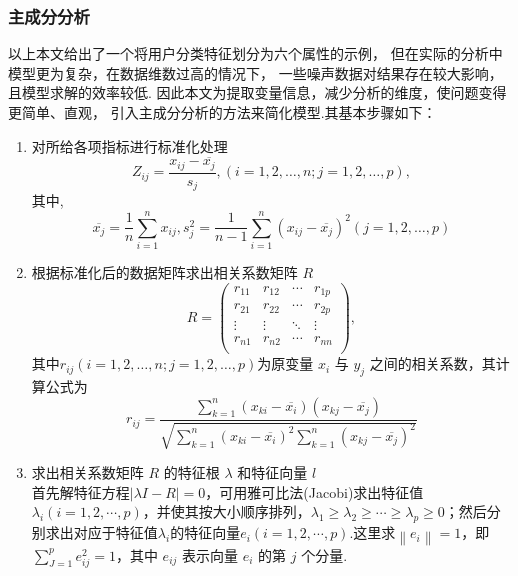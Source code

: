 \subsubsection{主成分分析}

以上本文给出了一个将用户分类特征划分为六个属性的示例，
但在实际的分析中模型更为复杂，在数据维数过高的情况下，
一些噪声数据对结果存在较大影响，且模型求解的效率较低.
因此本文为提取变量信息，减少分析的维度，使问题变得更简单、直观，
引入主成分分析的方法来简化模型.其基本步骤如下：

\begin{enumerate}[(1)]
    \item 对所给各项指标进行标准化处理
    \begin{equation}
        Z_{ij}=\frac{x_{ij}-\overline{x_j}}{s_j},(i=1,2,…,n;j=1,2,…,p),
    \end{equation}
    其中,
    \begin{equation}
        \overline{x_j}=\frac{1}{n}\sum\limits_{i=1}^{n}x_{ij},s_j^2=\frac{1}{n-1}
        \sum\limits_{i=1}^{n}(x_{ij}-\overline{x_j})^2(j=1,2,…,p)
    \end{equation}
    \item 根据标准化后的数据矩阵求出相关系数矩阵 $R$
    \begin{equation}
        R=\begin{pmatrix}
        r_{11} & r_{12} & \cdots & r_{1p}\\
        r_{21} & r_{22} & \cdots & r_{2p}\\
        \vdots & \vdots & \ddots & \vdots\\
        r_{n1} & r_{n2} & \cdots & r_{nn}\\
        \end{pmatrix},
    \end{equation}
    其中$r_{ij}(i=1,2,…,n;j=1,2,…,p)$为原变量 $x_i$ 与 $y_j$ 之间的相关系数，其计算公式为
    \begin{equation}
        r_{ij}=\frac{\sum\limits_{k=1}^{n}(x_{ki}-\overline{x_i})(x_{kj}-\overline{x_j})}{\sqrt{\sum\limits_{k=1}^{n}(x_{ki}-\overline{x_i})^2\sum\limits_{k=1}^{n}(x_{kj}-\overline{x_j})^2}}
    \end{equation}
    \item 求出相关系数矩阵 $R$ 的特征根 $\lambda$ 和特征向量 $l$
    \\首先解特征方程$\left| \lambda I-R\right|=0$，可用雅可比法(Jacobi)求出特征值$\lambda_i(i=1,2,\cdots,p)$，并使其按大小顺序排列，$\lambda_1\geq\lambda_2\geq\cdots\geq\lambda_p\geq0$；然后分别求出对应于特征值$\lambda_i$的特征向量$e_i(i=1,2,\cdots,p)$.这里求$\left\|e_i\right\|=1$，即$\sum\limits_{J=1}^{p}e_{ij}^2=1$，其中 $e_{ij}$ 表示向量 $e_i$ 的第 $j$ 个分量.

\end{enumerate}
